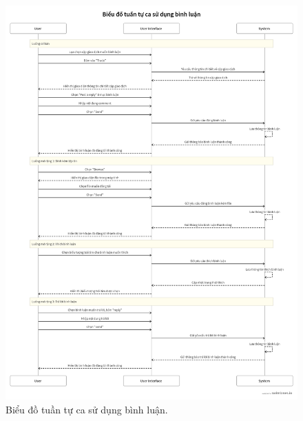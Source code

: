 \begin{figure}[H]
    \centering
    \includegraphics[width=1\textwidth]{figures/c2/CommentSeq.png}
    \caption{Biểu đồ tuần tự ca sử dụng bình luận.}
    \label{fig:architecture-diagram}
\end{figure}



